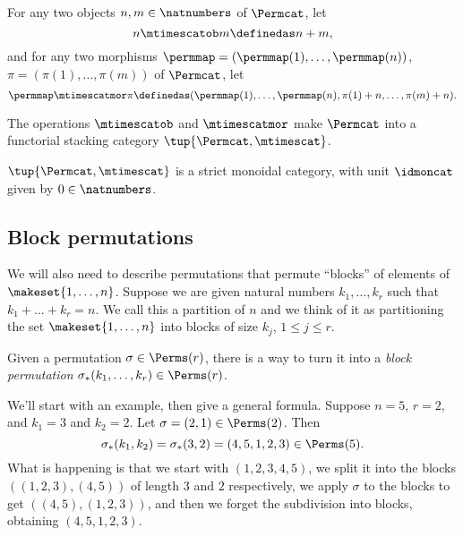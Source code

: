 \begin{definition}\label{def:Permcat-1}
    For any two objects $n, m \in \natnumbers$ of $\Permcat$, let
    \begin{equation}
        n \mtimescatob m \definedas n + m,
    \end{equation}
    and for any two morphisms $\permmap = (\permmap(1), \dots, \permmap(n))$, $\pi = (\pi(1), \dots, \pi(m))$ of $\Permcat$, let
    \begin{equation}
        \permmap \mtimescatmor \pi \definedas (\permmap(1), \dots, \permmap(n), \pi(1) + n, \dots, \pi(m) + n).
    \end{equation}
\end{definition}

\begin{lemma}
    The operations $\mtimescatob$ and $\mtimescatmor$ make $\Permcat$ into a functorial stacking category $\tup{\Permcat, \mtimescat}$.
\end{lemma}


\begin{lemma}
    $\tup{\Permcat, \mtimescat}$ is a strict monoidal category, with unit $\idmoncat$ given by $0 \in \natnumbers$.
\end{lemma}



\subsection{Block permutations}

We will also need to describe permutations that permute ``blocks'' of elements of $\makeset{1, \dots, n}$. Suppose we are given natural numbers $k_1, \dots, k_r$ such that $k_1 + \dots + k_r = n$. We call this a partition of $n$ and we think of it as partitioning the set $\makeset{1, \dots, n}$ into blocks of size $k_j$, $1 \leq j \leq r$.

Given a permutation $\sigma \in  \Perms(r)$, there is a way to turn it into a \emph{block permutation} $\sigma_*(k_1, \dots, k_r) \in \Perms(r)$. 


We'll start with an example, then give a general formula. Suppose $n = 5$, $r=2$, and $k_1 = 3$ and $k_2 = 2$. Let $\sigma = (2, 1) \in \Perms(2)$. Then 
$$
\sigma_*(k_1, k_2) = \sigma_*(3,2) = (4,5,1,2,3) \in \Perms(5). 
$$
What is happening is that we start with $(1,2,3,4,5)$, we split it into the blocks $((1,2,3),(4,5))$ of length $3$ and $2$ respectively, we apply $\sigma$ to the blocks to get $((4,5),(1,2,3))$, and then we forget the subdivision into blocks, obtaining $(4,5,1,2,3)$. 

